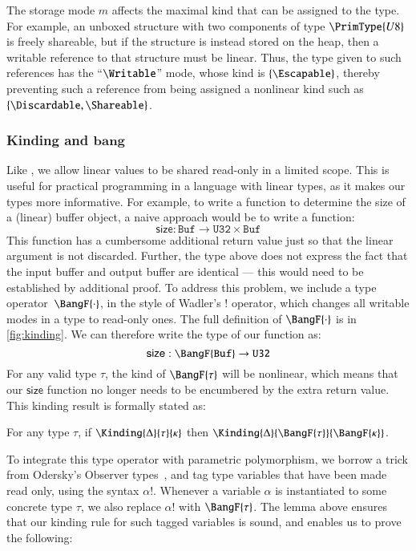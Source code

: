 \documentclass[9pt\ifFinal\else,preprint,nocopyrightspace\fi,\ifAlpha\else natbib,authoryear\fi]{sigplanconf}
\begin{document}
The storage mode $m$ affects the maximal kind that can be assigned
to the type. For example, an unboxed structure with two components of type $\PrimType{U8}$ is freely shareable, but if the structure is
instead stored on the heap, then a writable reference to that structure must be linear. Thus, the type given to such references has the ``$\Writable$'' mode,
whose kind is $\{\Escapable\}$, thereby preventing such a reference from being assigned a nonlinear kind such as $\{\Discardable,\Shareable\}$.




\subsubsection{Kinding and $\textbf{bang}$}
\label{sec:kindletb}

Like \citet{Wadler_90}, we allow linear values to be shared read-only in a limited scope. This is useful for practical programming
in a language with linear types, as it makes our types more informative. For example, to write a function to determine the size of a (linear) buffer object, 
a naive approach would be to write a function:
$$\mathsf{size} : \mathtt{Buf} \rightarrow \mathtt{U32} \times \mathtt{Buf}$$
This function has a cumbersome additional return value just so that the linear
argument is not discarded. Further, the type above does not express the fact that the
input buffer and output buffer are identical --- this would need to be established by additional proof.  To address this problem, we include a type operator~$\BangF{\cdot}$, in the style
of Wadler's $!$ operator, which changes all writable modes in a type to read-only ones. The full definition of $\BangF{\cdot}$ is in \autoref{fig:kinding}.
We can therefore write the type of our function as:
$$\mathsf{size} : \BangF{\mathtt{Buf}} \rightarrow \mathtt{U32}$$
For any valid type $\tau$, the kind of $\BangF{\tau}$ will be
nonlinear, which means that our $\mathsf{size}$ function no longer needs to be encumbered by the 
extra return value. This kinding result is formally stated as:

\begin{lemma} For any type $\tau$, if $\Kinding{\Delta}{\tau}{\kappa}$ then $\Kinding{\Delta}{\BangF{\tau}}{\BangF{\kappa}}$.
\end{lemma}

\noindent To integrate this type operator with parametric polymorphism, we borrow a trick from Odersky's Observer types~\citep{Odersky_92}, and tag type variables that
have been made read only, using the syntax $\alpha!$. Whenever a variable $\alpha$ is instantiated to some concrete type $\tau$, we also replace 
$\alpha!$ with $\BangF{\tau}$. The lemma above ensures that our kinding rule for such tagged variables is sound, and enables us to prove the following:
\end{document}
